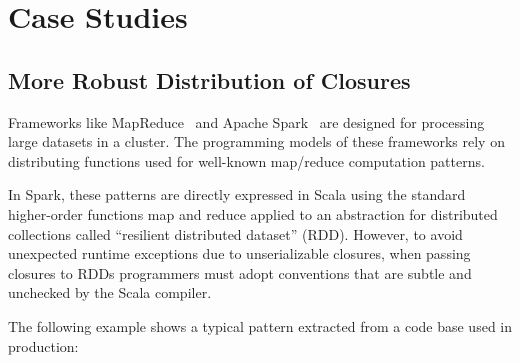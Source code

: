 \documentclass{llncs}
\begin{document}
\section{Case Studies}

\subsection{More Robust Distribution of Closures}

Frameworks like MapReduce~\cite{MapReduce} and Apache Spark~\cite{Spark} are designed for processing large datasets in a cluster. The programming models of these frameworks rely on distributing functions used for well-known map/reduce computation patterns.

In Spark, these patterns are directly expressed in Scala using the standard higher-order functions map and reduce applied to an abstraction for distributed collections called ``resilient distributed dataset'' (RDD). However, to avoid unexpected runtime exceptions due to unserializable closures, when passing closures to RDDs programmers must adopt conventions that are subtle and unchecked by the Scala compiler.

The following example shows a typical pattern extracted from a code base used in production:
\end{document}
